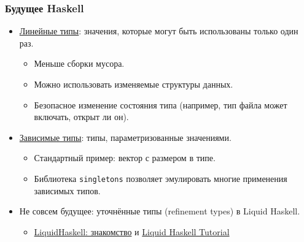 \documentclass[11pt]{beamer}
\begin{document}
\begin{frame}[fragile]
  \frametitle{Будущее Haskell}
  \begin{itemize}
    \item \href{https://www.tweag.io/posts/2017-03-13-linear-types.html}{Линейные типы}: значения, которые могут быть использованы только один раз.
          \begin{itemize}
            \item Меньше сборки мусора.
            \item Можно использовать изменяемые структуры данных.
            \item Безопасное изменение состояния типа (например, тип файла может включать, открыт ли он).
          \end{itemize}
          \pause
    \item \href{https://serokell.io/blog/2018/12/17/why-dependent-haskell}{Зависимые типы}: типы, параметризованные значениями.
          \begin{itemize}
            \item Стандартный пример: вектор с размером в типе.
            \item Библиотека \lstinline|singletons| позволяет эмулировать многие применения зависимых типов.
          \end{itemize}
          \pause
    \item Не совсем будущее: уточнённые типы (refinement types) в Liquid Haskell.
          \begin{itemize}
            \item \href{https://ruhaskell.org/posts/utils/2016/12/16/liquidhaskell-hello.html}{LiquidHaskell: знакомство} и \href{https://liquid.kosmikus.org/}{Liquid Haskell Tutorial}
          \end{itemize}
  \end{itemize}
\end{frame}
\end{document}
